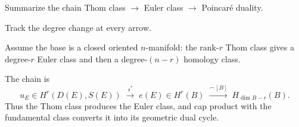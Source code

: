 \begin{exercise}\label{exr:viii31-24}
Summarize the chain Thom class $\to$ Euler class $\to$ Poincaré duality.
\end{exercise}
\begin{hint}
Track the degree change at every arrow.

Assume the base is a closed oriented \(n\)-manifold: the rank-\(r\) Thom class gives a degree-\(r\) Euler class and then a degree-\((n-r)\) homology class.
\end{hint}
\begin{solution}
The chain is
\[
u_E\in H^r(D(E),S(E))
\;\xrightarrow{s^*}\;
e(E)\in H^r(B)
\;\xrightarrow{\frown[B]}\;
H_{\dim B-r}(B).
\]
Thus the Thom class produces the Euler class, and cap product with the fundamental class converts it into its geometric dual cycle.
\end{solution}
